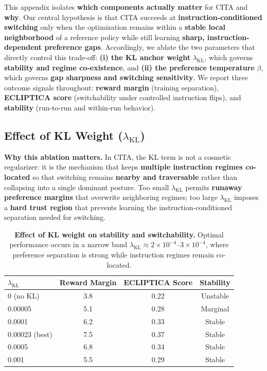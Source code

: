 \vspace{-0.25em}
\noindent
This appendix isolates \textbf{which components actually matter} for \textsc{CITA} and \textbf{why}.
Our central hypothesis is that \textsc{CITA} succeeds at \textbf{instruction-conditioned switching} only when the optimization remains within a \textbf{stable local neighborhood} of a reference policy while still learning \textbf{sharp, instruction-dependent preference gaps}.
Accordingly, we ablate the two parameters that directly control this trade-off:
\textbf{(i) the KL anchor weight} $\lambda_{\text{KL}}$, which governs \textbf{stability and regime co-existence}, and
\textbf{(ii) the preference temperature} $\beta$, which governs \textbf{gap sharpness and switching sensitivity}.
We report three outcome signals throughout:
\textbf{reward margin} (training separation), \textbf{ECLIPTICA score} (switchability under controlled instruction flips), and \textbf{stability} (run-to-run and within-run behavior).

\subsection{Effect of KL Weight ($\lambda_{\text{KL}}$)}

\vspace{-0.25em}
\noindent
\textbf{Why this ablation matters.}
In \textsc{CITA}, the KL term is not a cosmetic regularizer: it is the mechanism that keeps \textbf{multiple instruction regimes co-located} so that switching remains \textbf{nearby and traversable} rather than collapsing into a single dominant posture.
Too small $\lambda_{\text{KL}}$ permits \textbf{runaway preference margins} that overwrite neighboring regimes; too large $\lambda_{\text{KL}}$ imposes a \textbf{hard trust region} that prevents learning the instruction-conditioned separation needed for switching.

\begin{table}[H]
\centering
\small
\renewcommand{\arraystretch}{1.2}
\begin{tabular}{@{}lccc@{}}
\toprule
\textbf{$\lambda_{\text{KL}}$} & \textbf{Reward Margin} & \textbf{ECLIPTICA Score} & \textbf{Stability} \\
\midrule
0 (no KL) & 3.8 & 0.22 & Unstable \\ \hline
0.00005 & 5.1 & 0.28 & Marginal \\ \hline
0.0001 & 6.2 & 0.33 & Stable \\ \hline
0.00023 (best) & 7.5 & 0.37 & Stable \\ \hline
0.0005 & 6.8 & 0.34 & Stable \\ \hline
0.001 & 5.5 & 0.29 & Stable \\
\bottomrule
\end{tabular}
\caption{\textbf{Effect of KL weight on stability and switchability.} Optimal performance occurs in a narrow band $\lambda_{\text{KL}}\approx 2\times 10^{-4}$--$3\times 10^{-4}$, where preference separation is strong while instruction regimes remain co-located.}
\label{tab:kl_ablation}
\end{table}

